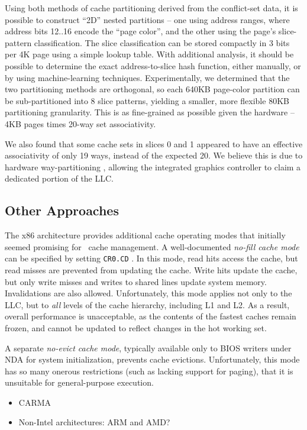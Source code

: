Using both methods of cache partitioning derived from the conflict-set
data, it is possible to construct ``2D'' nested partitions -- one
using address ranges, where address bits 12..16 encode the ``page
color'', and the other using the page's slice-pattern classification.
The slice classification can be stored compactly in 3 bits per 4K page
using a simple lookup table.  With additional analysis, it should be
possible to determine the exact address-to-slice hash function, either
manually, or by using machine-learning techniques.  Experimentally, we
determined that the two partitioning methods are orthogonal, so each
640KB page-color partition can be sub-partitioned into 8 slice
patterns, yielding a smaller, more flexible 80KB partitioning
granularity.  This is as fine-grained as possible given the hardware
-- 4KB pages times 20-way set associativity.

We also found that some cache sets in slices 0 and 1 appeared to have
an effective associativity of only 19 ways, instead of the expected
20.  We believe this is due to hardware way-partitioning
\cite{Iyer-CQOS}, allowing the integrated graphics controller to claim
a dedicated portion of the LLC.

\subsection{Other Approaches}

The x86 architecture provides additional cache operating modes that
initially seemed promising for \vcage\ cache management.  A
well-documented {\em no-fill cache mode} can be specified by setting
{\tt CR0.CD} \cite{Intel-SDM}.  In this mode, read hits access the
cache, but read misses are prevented from updating the cache.  Write
hits update the cache, but only write misses and writes to shared
lines update system memory. Invalidations are also
allowed. Unfortunately, this mode applies not only to the LLC, but to
{\em all} levels of the cache hierarchy, including L1 and L2.  As a
result, overall performance is unacceptable, as the contents of the
fastest caches remain frozen, and cannot be updated to reflect changes
in the hot working set.

A separate {\em no-evict cache mode}, typically available only to BIOS
writers under NDA for system initialization, prevents cache evictions.
Unfortunately, this mode has so many onerous restrictions (such as
lacking support for paging), that it is unsuitable for general-purpose
execution.

\begin{itemize}
    \item CARMA
    \item Non-Intel architectures: ARM and AMD?
\end{itemize}

